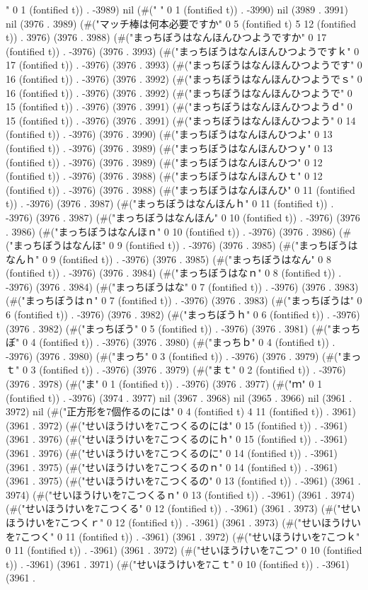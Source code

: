 " 0 1 (fontified t)) . -3989) nil (#("	" 0 1 (fontified t)) . -3990) nil (3989 . 3991) nil (3976 . 3989) (#("マッチ棒は何本必要ですか" 0 5 (fontified t) 5 12 (fontified t)) . 3976) (3976 . 3988) (#("まっちぼうはなんほんひつようですか" 0 17 (fontified t)) . -3976) (3976 . 3993) (#("まっちぼうはなんほんひつようですｋ" 0 17 (fontified t)) . -3976) (3976 . 3993) (#("まっちぼうはなんほんひつようです" 0 16 (fontified t)) . -3976) (3976 . 3992) (#("まっちぼうはなんほんひつようでｓ" 0 16 (fontified t)) . -3976) (3976 . 3992) (#("まっちぼうはなんほんひつようで" 0 15 (fontified t)) . -3976) (3976 . 3991) (#("まっちぼうはなんほんひつようｄ" 0 15 (fontified t)) . -3976) (3976 . 3991) (#("まっちぼうはなんほんひつよう" 0 14 (fontified t)) . -3976) (3976 . 3990) (#("まっちぼうはなんほんひつよ" 0 13 (fontified t)) . -3976) (3976 . 3989) (#("まっちぼうはなんほんひつｙ" 0 13 (fontified t)) . -3976) (3976 . 3989) (#("まっちぼうはなんほんひつ" 0 12 (fontified t)) . -3976) (3976 . 3988) (#("まっちぼうはなんほんひｔ" 0 12 (fontified t)) . -3976) (3976 . 3988) (#("まっちぼうはなんほんひ" 0 11 (fontified t)) . -3976) (3976 . 3987) (#("まっちぼうはなんほんｈ" 0 11 (fontified t)) . -3976) (3976 . 3987) (#("まっちぼうはなんほん" 0 10 (fontified t)) . -3976) (3976 . 3986) (#("まっちぼうはなんほｎ" 0 10 (fontified t)) . -3976) (3976 . 3986) (#("まっちぼうはなんほ" 0 9 (fontified t)) . -3976) (3976 . 3985) (#("まっちぼうはなんｈ" 0 9 (fontified t)) . -3976) (3976 . 3985) (#("まっちぼうはなん" 0 8 (fontified t)) . -3976) (3976 . 3984) (#("まっちぼうはなｎ" 0 8 (fontified t)) . -3976) (3976 . 3984) (#("まっちぼうはな" 0 7 (fontified t)) . -3976) (3976 . 3983) (#("まっちぼうはｎ" 0 7 (fontified t)) . -3976) (3976 . 3983) (#("まっちぼうは" 0 6 (fontified t)) . -3976) (3976 . 3982) (#("まっちぼうｈ" 0 6 (fontified t)) . -3976) (3976 . 3982) (#("まっちぼう" 0 5 (fontified t)) . -3976) (3976 . 3981) (#("まっちぼ" 0 4 (fontified t)) . -3976) (3976 . 3980) (#("まっちｂ" 0 4 (fontified t)) . -3976) (3976 . 3980) (#("まっち" 0 3 (fontified t)) . -3976) (3976 . 3979) (#("まっｔ" 0 3 (fontified t)) . -3976) (3976 . 3979) (#("まｔ" 0 2 (fontified t)) . -3976) (3976 . 3978) (#("ま" 0 1 (fontified t)) . -3976) (3976 . 3977) (#("ｍ" 0 1 (fontified t)) . -3976) (3974 . 3977) nil (3967 . 3968) nil (3965 . 3966) nil (3961 . 3972) nil (#("正方形を7個作るのには" 0 4 (fontified t) 4 11 (fontified t)) . 3961) (3961 . 3972) (#("せいほうけいを7こつくるのには" 0 15 (fontified t)) . -3961) (3961 . 3976) (#("せいほうけいを7こつくるのにｈ" 0 15 (fontified t)) . -3961) (3961 . 3976) (#("せいほうけいを7こつくるのに" 0 14 (fontified t)) . -3961) (3961 . 3975) (#("せいほうけいを7こつくるのｎ" 0 14 (fontified t)) . -3961) (3961 . 3975) (#("せいほうけいを7こつくるの" 0 13 (fontified t)) . -3961) (3961 . 3974) (#("せいほうけいを7こつくるｎ" 0 13 (fontified t)) . -3961) (3961 . 3974) (#("せいほうけいを7こつくる" 0 12 (fontified t)) . -3961) (3961 . 3973) (#("せいほうけいを7こつくｒ" 0 12 (fontified t)) . -3961) (3961 . 3973) (#("せいほうけいを7こつく" 0 11 (fontified t)) . -3961) (3961 . 3972) (#("せいほうけいを7こつｋ" 0 11 (fontified t)) . -3961) (3961 . 3972) (#("せいほうけいを7こつ" 0 10 (fontified t)) . -3961) (3961 . 3971) (#("せいほうけいを7こｔ" 0 10 (fontified t)) . -3961) (3961 . 